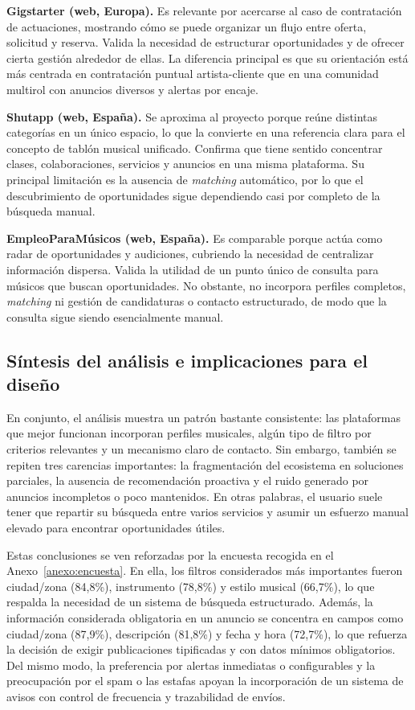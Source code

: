 \documentclass[12pt,a4paper]{report}
\begin{document}
\textbf{Gigstarter (web, Europa).} Es relevante por acercarse al caso de contratación de actuaciones, mostrando cómo se puede organizar un flujo entre oferta, solicitud y reserva. Valida la necesidad de estructurar oportunidades y de ofrecer cierta gestión alrededor de ellas. La diferencia principal es que su orientación está más centrada en contratación puntual artista-cliente que en una comunidad multirol con anuncios diversos y alertas por encaje.

\textbf{Shutapp (web, España).} Se aproxima al proyecto porque reúne distintas categorías en un único espacio, lo que la convierte en una referencia clara para el concepto de tablón musical unificado. Confirma que tiene sentido concentrar clases, colaboraciones, servicios y anuncios en una misma plataforma. Su principal limitación es la ausencia de \textit{matching} automático, por lo que el descubrimiento de oportunidades sigue dependiendo casi por completo de la búsqueda manual.

\textbf{EmpleoParaMúsicos (web, España).} Es comparable porque actúa como radar de oportunidades y audiciones, cubriendo la necesidad de centralizar información dispersa. Valida la utilidad de un punto único de consulta para músicos que buscan oportunidades. No obstante, no incorpora perfiles completos, \textit{matching} ni gestión de candidaturas o contacto estructurado, de modo que la consulta sigue siendo esencialmente manual.

\subsection{Síntesis del análisis e implicaciones para el diseño}
En conjunto, el análisis muestra un patrón bastante consistente: las plataformas que mejor funcionan incorporan perfiles musicales, algún tipo de filtro por criterios relevantes y un mecanismo claro de contacto. Sin embargo, también se repiten tres carencias importantes: la fragmentación del ecosistema en soluciones parciales, la ausencia de recomendación proactiva y el ruido generado por anuncios incompletos o poco mantenidos. En otras palabras, el usuario suele tener que repartir su búsqueda entre varios servicios y asumir un esfuerzo manual elevado para encontrar oportunidades útiles.

Estas conclusiones se ven reforzadas por la encuesta recogida en el Anexo~\ref{anexo:encuesta}. En ella, los filtros considerados más importantes fueron ciudad/zona (84,8\%), instrumento (78,8\%) y estilo musical (66,7\%), lo que respalda la necesidad de un sistema de búsqueda estructurado. Además, la información considerada obligatoria en un anuncio se concentra en campos como ciudad/zona (87,9\%), descripción (81,8\%) y fecha y hora (72,7\%), lo que refuerza la decisión de exigir publicaciones tipificadas y con datos mínimos obligatorios. Del mismo modo, la preferencia por alertas inmediatas o configurables y la preocupación por el spam o las estafas apoyan la incorporación de un sistema de avisos con control de frecuencia y trazabilidad de envíos.
\end{document}
